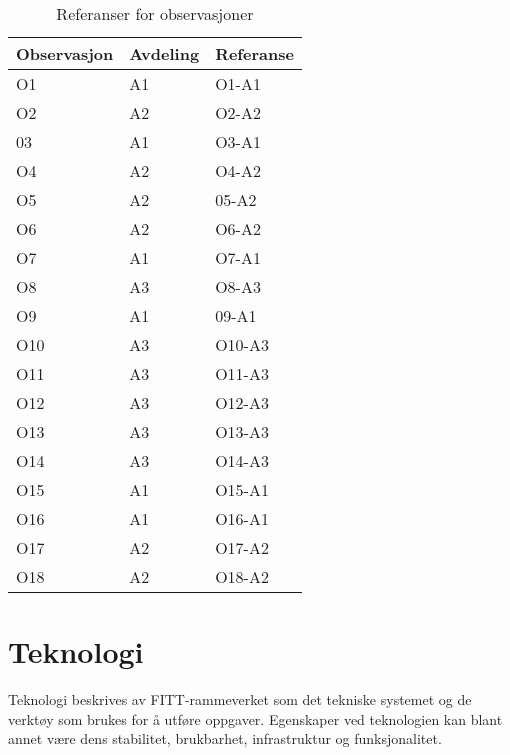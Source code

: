 \begin{table}[H]\centering
    \begin{tabular}{ |l|l|l| }
    \hline
    Observasjon & Avdeling & Referanse \\ \hline
    O1          & A1       & O1-A1     \\ \hline
    O2          & A2       & O2-A2     \\ \hline
    03          & A1       & O3-A1     \\ \hline
    O4          & A2       & O4-A2     \\ \hline
    O5          & A2       & 05-A2     \\ \hline
    O6          & A2       & O6-A2     \\ \hline
    O7          & A1       & O7-A1     \\ \hline
    O8          & A3       & O8-A3     \\ \hline
    O9          & A1       & 09-A1     \\ \hline
    O10         & A3       & O10-A3    \\ \hline
    O11         & A3       & O11-A3    \\ \hline
    O12         & A3       & O12-A3    \\ \hline
    O13         & A3       & O13-A3    \\ \hline
    O14         & A3       & O14-A3    \\ \hline
    O15         & A1       & O15-A1    \\ \hline
    O16         & A1       & O16-A1    \\ \hline
    O17         & A2       & O17-A2    \\ \hline
    O18         & A2       & O18-A2    \\ \hline
    \end{tabular}
    \caption {Referanser for observasjoner}
    \label{referanserobservasjon}
\end{table}

\section{Teknologi}
Teknologi beskrives av FITT-rammeverket som det tekniske systemet og de verktøy som brukes for å utføre oppgaver. Egenskaper ved teknologien kan blant annet være dens stabilitet, brukbarhet, infrastruktur og funksjonalitet. 

